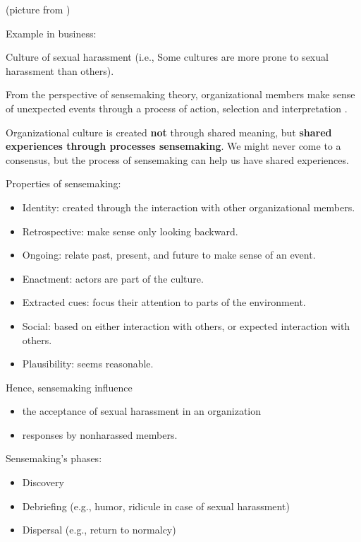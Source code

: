 \documentclass[
]{book}
\providecommand{\tightlist}{%
  \setlength{\itemsep}{0pt}\setlength{\parskip}{0pt}}
\begin{document}
(picture from \citep{Lu_2017})

Example in business: \citep{KennethWm_2014}

\citep{Dougherty_2004}

Culture of sexual harassment (i.e., Some cultures are more prone to sexual harassment than others).

From the perspective of sensemaking theory, organizational members make sense of unexpected events through a process of action, selection and interpretation \citep{Weick_1995}.

Organizational culture is created \textbf{not} through shared meaning, but \textbf{shared experiences through processes sensemaking}.
We might never come to a consensus, but the process of sensemaking can help us have shared experiences.

Properties of sensemaking:

\begin{itemize}
\tightlist
\item
  Identity: created through the interaction with other organizational members.
\item
  Retrospective: make sense only looking backward.
\item
  Ongoing: relate past, present, and future to make sense of an event.
\item
  Enactment: actors are part of the culture.
\item
  Extracted cues: focus their attention to parts of the environment.
\item
  Social: based on either interaction with others, or expected interaction with others.
\item
  Plausibility: seems reasonable.
\end{itemize}

Hence, sensemaking influence

\begin{itemize}
\tightlist
\item
  the acceptance of sexual harassment in an organization
\item
  responses by nonharassed members.
\end{itemize}

Sensemaking's phases:

\begin{itemize}
\tightlist
\item
  Discovery
\item
  Debriefing (e.g., humor, ridicule in case of sexual harassment)
\item
  Dispersal (e.g., return to normalcy)
\end{itemize}
\end{document}
